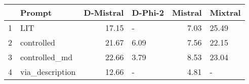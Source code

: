 \begin{tabular}{llrlrl}
\toprule
 & Prompt & D-Mistral & D-Phi-2 & Mistral & Mixtral \\
\midrule
1 & LIT & 17.15 & - & 7.03 & 25.49 \\
2 & controlled & 21.67 & 6.09 & 7.56 & 22.15 \\
3 & controlled_md & 22.66 & 3.79 & 8.53 & 23.04 \\
4 & via_description & 12.66 & - & 4.81 & - \\
\bottomrule
\end{tabular}
